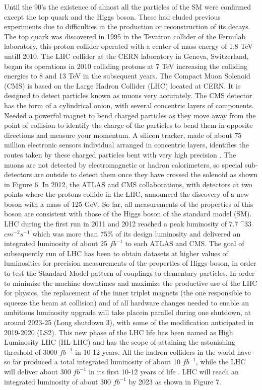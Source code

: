 \documentclass[final,3p]{CSP}
\begin{document}
Until the 90's the existence of almost all the particles of the SM were confirmed except the top quark and the Higgs boson. 
These had eluded previous experiments due to difficulties in the production or reconstruction of its decays. The top quark was 
discovered in 1995 in the Tevatron collider of the Fermilab laboratory, this proton collider operated with a center of mass 
energy of 1.8 TeV untill 2010. The LHC collider at the CERN laboratory in Geneva, Switzerland, began its operations in 2010 
colliding protons at 7 TeV increasing the colliding energies to 8 and 13 TeV in the subsequent years. The Compact Muon Solenoid (CMS) is based on the Large Hadron Collider (LHC) located at CERN. It is designed to detect particles known as muons very accurately. The CMS detector has the form of a cylindrical onion, with several concentric layers of components. Needed a powerful magnet to bend charged particles as they move away from the point of collision to identify the charge of the particles to bend them in opposite directions and measure your momentum. A silicon tracker, made of about 75 
million electronic sensors individual arranged in concentric layers, identifies the routes taken by these charged particles bent with very high precision \cite{Chatrchyan:2008aa}. The muons are not detected by electromagnetic or hadron calorimeters, so special sub-detectors are outside to detect them once they have crossed the solenoid as shown in Figure 6. In 2012, the ATLAS and CMS collaborations, with detectors at two points where the protons collide in the LHC, announced the discovery of a new boson with a mass of 125 GeV. So far, all measurements of the properties of this boson are consistent with those of the Higgs boson of the standard model (SM). LHC during the first run in 2011 and 2012 reached a peak luminosity of 7.7 ^{33} $cm^{-2}s^{-1}$ which was more than 75$\%$ of its design luminosity and delivered an integrated luminosity of about 25 $fb^{-1}$ to each ATLAS and CMS. The goal of subsequently run of LHC has been to obtain datasets at higher values of luminosities for precision measurements of the properties of Higgs boson, in order to test the Standard Model pattern of couplings to elementary particles. In order to minimize the machine downtimes and maximize the productive use of the LHC for physics, the replacement of the inner triplet magnets (the one responsible to squeeze the beam at collision) and  of  all  hardware  changes  needed  to  enable  an  ambitious  luminosity  upgrade  will  take  placein parallel during one shutdown, at around 2023-25 (Long shutdown 3), with some of the modification anticipated in 2019-2020 (LS2). This new phase of the LHC life has been named as High Luminosity LHC (HL-LHC) and has the scope of attaining the astonishing threshold of 3000 $fb^{-1}$ in 10-12 years. All the hadron colliders in the world have so far produced a total integrated luminosity of about 10 $fb^{-1}$, while the LHC will deliver about 300 $fb^{-1}$ in its first 10-12 years of life \cite{collaborations2019report}. LHC will reach an integrated luminosity of about 300 $fb^{-1}$ by 2023 as shown in Figure 7. \\
\end{document}
